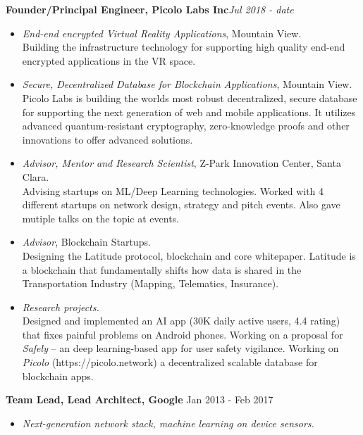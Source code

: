 \begin{resume}
    {\bf Founder/Principal Engineer, Picolo Labs Inc}\hfill{\it Jul 2018 - date}
    \begin{itemize}
        \item [] {\it End-end encrypted Virtual Reality Applications}, Mountain View. \\
              Building the infrastructure technology for supporting high quality end-end encrypted
              applications in the VR space.
        \item [] {\it Secure, Decentralized Database for Blockchain Applications}, Mountain View. \\
              Picolo Labs is building the worlds most robust decentralized, secure database for supporting
              the next generation of web and mobile applications. It utilizes advanced quantum-resistant
              cryptography, zero-knowledge proofs and other innovations to offer advanced solutions.
        \item [] {\it Advisor, Mentor and Research Scientist}, Z-Park Innovation Center, Santa Clara. \\
            Advising startups on ML/Deep Learning technologies. Worked with 4 different startups on network design,
            strategy and pitch events. Also gave mutiple talks on the topic at events.
        \item [] {\it Advisor}, Blockchain Startups. \\ 
            Designing the Latitude protocol, blockchain and core
            whitepaper. Latitude is a blockchain that fundamentally shifts how data is shared in the Transportation
            Industry (Mapping, Telematics, Insurance).
        \item [] {\it Research projects.} \\
            Designed and implemented an AI app (30K daily active users, 4.4 rating) that fixes painful problems on Android phones. 
            Working on a proposal for {\em Safely} -- an deep learning-based app for user safety vigilance. Working on
            {\em Picolo} (https://picolo.network) a decentralized scalable database for blockchain apps.
    \end{itemize}
    {\bf Team Lead, Lead Architect, Google} \hfill{Jan 2013 - Feb 2017}
    \begin{itemize}
        \item[] {\it Next-generation network stack, machine learning on device sensors.}\\


\end{itemize}
\end{resume}
